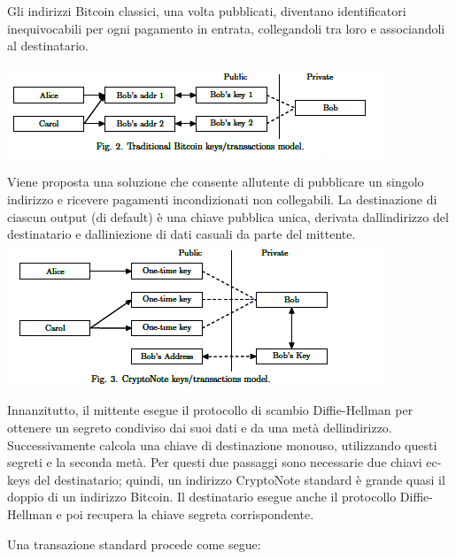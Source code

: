 \documentclass[
]{article}
\begin{document}
Gli indirizzi Bitcoin classici, una volta pubblicati, diventano
identificatori inequivocabili per ogni pagamento in entrata,
collegandoli tra loro e associandoli al destinatario.

\includegraphics{media/image6.png}

Viene proposta una soluzione che consente all\textquotesingle utente di
pubblicare un singolo indirizzo e ricevere pagamenti incondizionati non
collegabili. La destinazione di ciascun output (di default) è una chiave
pubblica unica, derivata dall\textquotesingle indirizzo del destinatario
e dall\textquotesingle iniezione di dati casuali da parte del
mittente.\\

\includegraphics{media/image7.png}

Innanzitutto, il mittente esegue il protocollo di scambio Diffie-Hellman
per ottenere un segreto condiviso dai suoi dati e da una metà
dell\textquotesingle indirizzo. Successivamente calcola una chiave di
destinazione monouso, utilizzando questi segreti e la seconda metà. Per
questi due passaggi sono necessarie due chiavi ec-keys del destinatario;
quindi, un indirizzo CryptoNote standard è grande quasi il doppio di un
indirizzo Bitcoin. Il destinatario esegue anche il protocollo
Diffie-Hellman e poi recupera la chiave segreta corrispondente.

Una transazione standard procede come segue:
\end{document}
